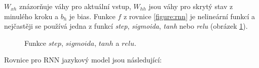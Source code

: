 $W_{xh}$ znázorňuje váhy pro aktuální vstup, $W_{hh}$ jsou váhy pro skrytý stav z minulého kroku a $b_h$ je bias. Funkce $f$ z rovnice \ref{figure:rnn} je nelineární funkcí a nejčastěji se používá jedna z funkcí \emph{step}, \emph{sigmoida}, \emph{tanh} nebo \emph{relu} (obrázek \ref{img:functions}).

\begin{figure}[h]
    \begin{center}
    \end{center}
	\caption{Funkce $step$, $sigmoida$, $tanh$ a $relu$.}
	\label{img:functions}
\end{figure}

Rovnice pro RNN jazykový model jsou následující:

